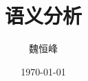 \documentclass[]{beamer}
\title[语义分析]{语义分析}
\author[魏恒峰]{\large 魏恒峰}
\institute{hfwei@nju.edu.cn}
\date{\today}
\begin{document}
\maketitle




\thankyou{}

\end{document}
